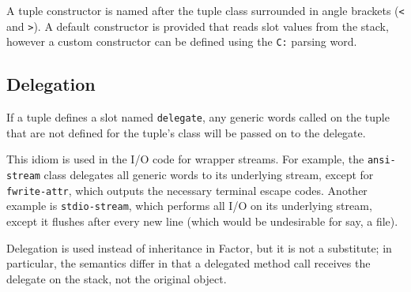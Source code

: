 \documentclass[english]{book}
\begin{document}
A tuple constructor is named after the tuple class surrounded in angle
brackets (\texttt{<} and \texttt{>}). A default constructor is provided
that reads slot values from the stack, however a custom constructor can
be defined using the \texttt{C:} parsing word.

\subsection{Delegation}

If a tuple defines a slot named \texttt{delegate}, any generic words called on
the tuple that are not defined for the tuple's class will be passed on
to the delegate.

This idiom is used in the I/O code for wrapper streams. For example, the
\texttt{ansi-stream} class delegates all generic words to its underlying stream,
except for \texttt{fwrite-attr}, which outputs the necessary terminal escape
codes. Another example is \texttt{stdio-stream}, which performs all I/O on its
underlying stream, except it flushes after every new line (which would
be undesirable for say, a file).

Delegation is used instead of inheritance in Factor, but it is not a
substitute; in particular, the semantics differ in that a delegated
method call receives the delegate on the stack, not the original object.


\end{document}

